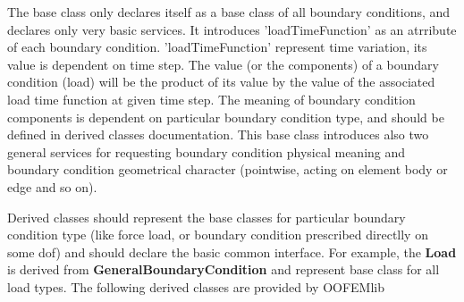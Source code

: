 \documentclass[a4paper]{article}
\newcommand{\class}[1]{{\bf #1}}
\begin{document}
The base class only declares itself as a base class of all boundary
conditions, and declares only very basic services. It introduces 
'loadTimeFunction' as an atrribute of each boundary condition. 
'loadTimeFunction' represent time variation, its value is dependent on time step.
The value (or the components) of a boundary condition (load) will be 
the product of its value by the value of the associated load time function at given time step.
The meaning of boundary condition components is dependent on particular boundary condition type,
and should be defined in derived classes documentation. This base
class introduces also two general services for requesting  boundary
condition physical meaning and boundary condition geometrical
character (pointwise, acting on element body or edge and so on).

Derived classes should represent the base classes for particular boundary condition type (like
force load, or boundary condition prescribed directlly on some dof) and should declare
the basic common interface. For example, the \class{Load} is derived
from \class{GeneralBoundaryCondition} and represent base class for all
load types. The following derived classes are provided by OOFEMlib
\end{document}
